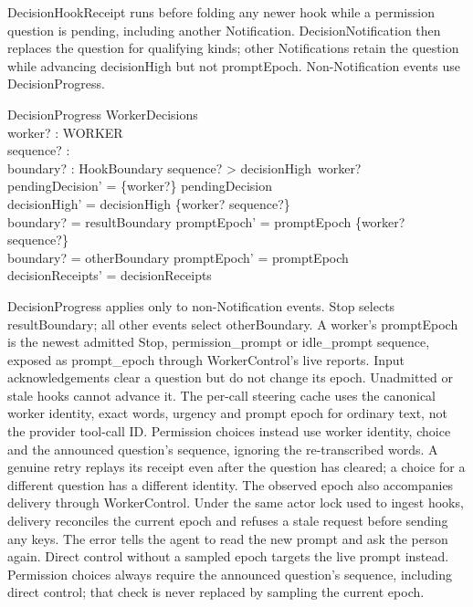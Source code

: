 \documentclass[a4paper,10pt,fleqn]{article}
\begin{document}
DecisionHookReceipt runs before folding any newer hook while a permission question is
pending, including another Notification. DecisionNotification then replaces
the question for qualifying kinds; other Notifications retain the question
while advancing decisionHigh but not promptEpoch. Non-Notification events use
DecisionProgress.

\begin{schema}{DecisionProgress}
  \Delta WorkerDecisions \\
  worker? : WORKER \\
  sequence? : \nat \\
  boundary? : HookBoundary
\where
  sequence? > decisionHigh~worker? \\
  pendingDecision' = \{worker?\} \ndres pendingDecision \\
  decisionHigh' = decisionHigh \oplus \{worker? \mapsto sequence?\} \\
  boundary? = resultBoundary \implies
    promptEpoch' = promptEpoch \oplus \{worker? \mapsto sequence?\} \\
  boundary? = otherBoundary \implies promptEpoch' = promptEpoch \\
  decisionReceipts' = decisionReceipts
\end{schema}

DecisionProgress applies only to non-Notification events.
Stop selects resultBoundary; all other events select otherBoundary. A worker's
promptEpoch is the newest admitted Stop, permission\_prompt or idle\_prompt
sequence, exposed as prompt\_epoch through WorkerControl's live reports. Input
acknowledgements clear a question but do not change its epoch. Unadmitted or
stale hooks cannot advance it. The per-call steering cache uses the canonical
worker identity, exact words, urgency and prompt epoch for ordinary text, not
the provider tool-call ID. Permission choices instead use worker identity,
choice and the announced question's sequence, ignoring the re-transcribed
words. A genuine retry replays its receipt even after the question has cleared;
a choice for a different question has a different identity.
The observed epoch also accompanies delivery through WorkerControl. Under the
same actor lock used to ingest hooks, delivery reconciles the current epoch
and refuses a stale request before sending any keys. The error tells the agent
to read the new prompt and ask the person again. Direct control without a
sampled epoch targets the live prompt instead.
Permission choices always require the announced question's sequence, including
direct control; that check is never replaced by sampling the current epoch.
\end{document}
